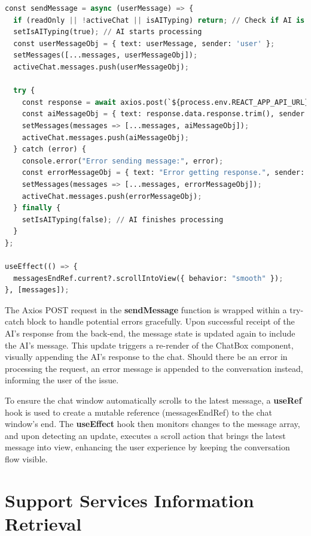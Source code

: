\documentclass{l4proj}
\begin{document}
\begin{lstlisting}[language=Python, caption={sendMessage Function}]
const sendMessage = async (userMessage) => {
  if (readOnly || !activeChat || isAITyping) return; // Check if AI is already processing
  setIsAITyping(true); // AI starts processing
  const userMessageObj = { text: userMessage, sender: 'user' };
  setMessages([...messages, userMessageObj]);
  activeChat.messages.push(userMessageObj);

  try {
    const response = await axios.post(`${process.env.REACT_APP_API_URL}/ask`, { prompt: userMessage });
    const aiMessageObj = { text: response.data.response.trim(), sender: 'ai' };
    setMessages(messages => [...messages, aiMessageObj]);
    activeChat.messages.push(aiMessageObj);
  } catch (error) {
    console.error("Error sending message:", error);
    const errorMessageObj = { text: "Error getting response.", sender: 'ai' };
    setMessages(messages => [...messages, errorMessageObj]);
    activeChat.messages.push(errorMessageObj);
  } finally {
    setIsAITyping(false); // AI finishes processing
  }
};

useEffect(() => {
  messagesEndRef.current?.scrollIntoView({ behavior: "smooth" });
}, [messages]);
\end{lstlisting}


The Axios POST request in the \textbf{sendMessage} function is wrapped within a try-catch block to handle potential errors gracefully. Upon successful receipt of the AI's response from the back-end, the message state is updated again to include the AI's message. This update triggers a re-render of the ChatBox component, visually appending the AI's response to the chat. Should there be an error in processing the request, an error message is appended to the conversation instead, informing the user of the issue.

To ensure the chat window automatically scrolls to the latest message, a \textbf{useRef} hook is used to create a mutable reference (messagesEndRef) to the chat window's end. The \textbf{useEffect} hook then monitors changes to the message array, and upon detecting an update, executes a scroll action that brings the latest message into view, enhancing the user experience by keeping the conversation flow visible.

\section{Support Services Information Retrieval}
\label{Support Services Information Retrieval}
\end{document}
